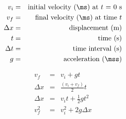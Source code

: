 \begin{eqnarray*}
v_i &=& \mbox{initial velocity (\ms) at $t$ = 0 s} \\
v_f &=& \mbox{final velocity (\ms) at time $t$}\\
\Delta x &=& \mbox{displacement (m)} \\
t &=& \mbox{time (s)} \\
\Delta t &=& \mbox{time interval (s)} \\
g &=& \mbox{acceleration (\mss)}
\end{eqnarray*}

\begin{eqnarray}
v_f &=& v_i + gt \label{eq:pg:eq1}\\
\Delta x &=& \frac{(v_i + v_f)}{2} t\label{eq:pg:eq2}\\
\Delta x &=& v_it + \frac{1}{2}gt^2 \label{eq:pg:eq3}\\
v_f^2 &=& v_i^2 + 2g \Delta x \label{eq:pg:eq4}
\end{eqnarray}

